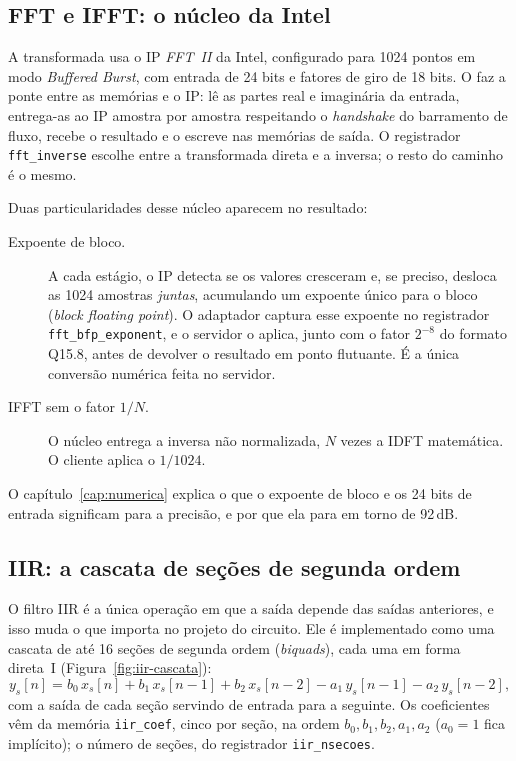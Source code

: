 \subsection{FFT e IFFT: o núcleo da Intel}
\label{sec:acel-fft}

A transformada usa o IP \emph{FFT~II} da Intel, configurado para 1024 pontos
em modo \emph{Buffered Burst}, com entrada de 24 bits e fatores de giro de
18 bits. O  faz a ponte entre as memórias e o IP: lê as
partes real e imaginária da entrada, entrega-as ao IP amostra por amostra
respeitando o \emph{handshake} do barramento de fluxo, recebe o resultado e o
escreve nas memórias de saída. O registrador \texttt{fft\_inverse} escolhe entre
a transformada direta e a inversa; o resto do caminho é o mesmo.

Duas particularidades desse núcleo aparecem no resultado:

\begin{description}
  \item[Expoente de bloco.] A cada estágio, o IP detecta se os valores
    cresceram e, se preciso, desloca as 1024 amostras \emph{juntas},
    acumulando um expoente único para o bloco (\emph{block floating point}). O
    adaptador captura esse expoente no registrador \texttt{fft\_bfp\_exponent},
    e o servidor o aplica, junto com o fator \(2^{-8}\) do formato Q15.8, antes
    de devolver o resultado em ponto flutuante. É a única conversão numérica
    feita no servidor.
  \item[IFFT sem o fator \(1/N\).] O núcleo entrega a inversa não normalizada,
    \(N\) vezes a IDFT matemática. O cliente aplica o \(1/1024\).
\end{description}

O capítulo~\ref{cap:numerica} explica o que o expoente de bloco e os 24 bits
de entrada significam para a precisão, e por que ela para em torno de 92\,dB.

\subsection{IIR: a cascata de seções de segunda ordem}
\label{sec:acel-iir}

O filtro IIR é a única operação em que a saída depende das saídas anteriores,
e isso muda o que importa no projeto do circuito. Ele é implementado como uma
cascata de até 16 seções de segunda ordem (\emph{biquads}), cada uma em forma
direta~I (Figura~\ref{fig:iir-cascata}):
\[
  y_s[n] = b_0\,x_s[n] + b_1\,x_s[n-1] + b_2\,x_s[n-2]
           - a_1\,y_s[n-1] - a_2\,y_s[n-2],
\]
com a saída de cada seção servindo de entrada para a seguinte. Os coeficientes
vêm da memória \texttt{iir\_coef}, cinco por seção, na ordem
\(b_0, b_1, b_2, a_1, a_2\) (\(a_0 = 1\) fica implícito); o número de seções,
do registrador \texttt{iir\_nsecoes}.

